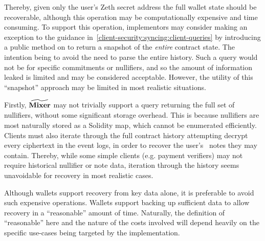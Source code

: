 Thereby, given only the user's Zeth secret address the full wallet state should be recoverable, although this operation may be computationally expensive and time consuming. To support this operation, implementors may consider making an exception to the guidance in~\cref{client-security:syncing:client-queries} by introducing a public method on \mixer{} to return a snapshot of the \emph{entire} contract state. The intention being to avoid the need to parse the entire \mixer{} history. Such a query would not be for specific commitments or nullifiers, and so the amount of information leaked is limited and may be considered acceptable.  However, the utility of this ``snapshot'' approach may be limited in most realistic situations.

Firstly, $\widetilde{\mathbf{Mixer}}$ may not trivially support a query returning the full set of nullifiers, without some significant storage overhead. This is because nullifiers are most naturally stored as a Solidity map, which cannot be enumerated efficiently. Clients must also iterate through the full contract history attempting decrypt every ciphertext in the event logs, in order to recover the user's \zeth~notes they may contain. Thereby, while some simple clients (e.g. payment verifiers) may not require historical nullifier or note data, iteration through the \mixer{} history seems unavoidable for recovery in most realistic cases.

Although wallets \SHOULD{} support recovery from key data alone, it is preferable to avoid such expensive operations. Wallets \SHOULD{} support backing up sufficient data to allow recovery in a ``reasonable'' amount of time. Naturally, the definition of ``reasonable'' here and the nature of the costs involved will depend heavily on the specific use-cases being targeted by the implementation.

